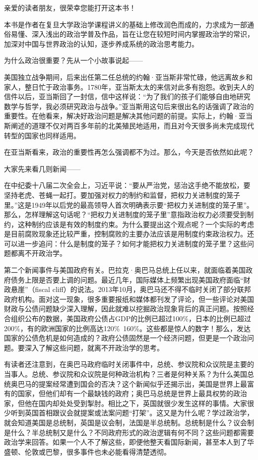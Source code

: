 
亲爱的读者朋友，很荣幸您能打开这本书！

本书是作者在复旦大学政治学课程讲义的基础上修改润色而成的，力求成为一部通俗易懂、深入浅出的政治学普及作品，旨在让您在较短时间内掌握政治学的常识，加深对中国与世界政治的认知，逐步养成系统的政治思考能力。

为什么政治很重要？先从一个小故事说起——

美国独立战争期间，后来出任第二任总统的约翰·亚当斯非常忙碌，他远离故乡和家人，整日忙于政治事务。1780年，亚当斯太太的来信对此多有抱怨。收到夫人的信件以后，亚当斯回了一封信，信中这样说：“为了我们的孩子们能够自由地研究数学与哲学，我必须研究政治与战争。”亚当斯用这句后来很出名的话强调了政治的重要性。在他看来，解决好政治问题是解决其他问题的前提。实际上，约翰·亚当斯阐述的道理不仅对两百多年前的北美殖民地适用，而且对今天很多尚未完成现代转型的国家也同样适用。

在亚当斯看来，政治的重要性再怎么强调都不为过。那么，今天是否依然如此呢？

大家先来看几则新闻——

在中纪委十八届二次全会上，习近平说：“要从严治党，惩治这手绝不能放松，要坚持老虎、苍蝇一起打。要加强对权力的制约和监督，把权力关进制度的笼子里。”这是1949年以后党的最高领导人首次明确表示要“把权力关进制度的笼子里”。那么，怎样理解这句话呢？“把权力关进制度的笼子里”意指政治权力必须要受到制约，这种制约应该是有效的制度约束。为什么要提出这个观点呢？一个实际的考虑是目前腐败现象还比较严重，控制腐败的主要办法应该是用制度约束政治权力。还可以进一步追问：什么是制度的笼子？如何才能把权力关进制度的笼子里？这些问题都离不开政治学。

第二个新闻事件与美国政府有关。巴拉克·奥巴马总统上任以来，就面临着美国政府债务上限是否要上调的问题。最近几年，国际媒体上频繁出现美国政府面临“财政悬崖”（fiscal cliff）的说法。2013年10月，奥巴马还不得不临时关闭了部分联邦政府机构。面对这一现象，很多重要报纸和媒体都刊发了评论，但一些评论对美国财政与公债问题缺少深入理解，因此就难以挖掘政治现象背后的真正问题。按照经合组织公布的数据，美国政府公债占GDP的比例已超过100\%，日本的比例已超过200\%，有的欧洲国家的比例高达120\%~160\%。这些都是惊人的数字！那么，发达国家的公债危机是如何造成的？政府公债固然是一个经济问题，但更是一个政治问题。要深入了解这些问题，就离不开政治学的思考。

有读者还注意到，在奥巴马政府临时关闭事件中，总统、参议院和众议院是主要的当事人。总统、参议院和众议院是何种政治机构？三者是何种关系？为什么美国总统奥巴马的提案经常遭到国会的否决？这个新闻似乎还揭示出，美国是世界上最富有的国家，但他们却有一个最缺钱的政府；奥巴马总统是世界上最具权势的政治家，但他在国内却处处受到掣肘。相比之下，英国就很少发生这样的事情。大家很少听到英国首相跟议会就提案或法案问题“打架”。这又是为什么呢？学过政治学，就会知道美国是总统制，英国是议会制，法国是半总统制。总统制是什么？议会制是什么？半总统制又是什么？不同政府形式的政治逻辑有何不同？这些问题都需要政治学来回答。如果一个人不了解这些，即便他整天看国际新闻，甚至本人到了华盛顿、伦敦或巴黎，很多事件也未必能看得清楚透彻。

